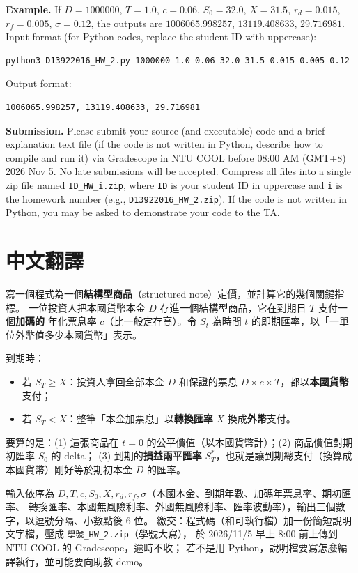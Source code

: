 \documentclass[11pt,a4paper]{article}
\begin{document}
\textbf{Example.} If $D=1000000$, $T=1.0$, $c=0.06$, $S_0=32.0$, $X=31.5$,
$r_d=0.015$, $r_f=0.005$, $\sigma=0.12$, the outputs are
$1006065.998257$, $13119.408633$, $29.716981$.
Input format (for Python codes, replace the student ID with uppercase):
\begin{verbatim}
python3 D13922016_HW_2.py 1000000 1.0 0.06 32.0 31.5 0.015 0.005 0.12
\end{verbatim}
Output format:
\begin{verbatim}
1006065.998257, 13119.408633, 29.716981
\end{verbatim}

\textbf{Submission.} Please submit your source (and executable) code and a brief
explanation text file (if the code is not written in Python, describe how to
compile and run it) via Gradescope in NTU COOL before 08:00 AM (GMT+8) 2026
Nov 5. No late submissions will be accepted. Compress all files into a single
zip file named \texttt{ID\_HW\_i.zip}, where \texttt{ID} is your student ID in
uppercase and \texttt{i} is the homework number (e.g.,
\texttt{D13922016\_HW\_2.zip}). If the code is not written in Python, you may
be asked to demonstrate your code to the TA.

\section{中文翻譯}

寫一個程式為一個\textbf{結構型商品}（structured note）定價，並計算它的幾個關鍵指標。
一位投資人把本國貨幣本金 $D$ 存進一個結構型商品，它在到期日 $T$ 支付一個\textbf{加碼的}
年化票息率 $c$（比一般定存高）。令 $S_t$ 為時間 $t$ 的即期匯率，以「一單位外幣值多少本國貨幣」表示。

到期時：
\begin{itemize}[nosep]
  \item 若 $S_T\ge X$：投資人拿回全部本金 $D$ 和保證的票息 $D\times c\times T$，都以\textbf{本國貨幣}支付；
  \item 若 $S_T<X$：整筆「本金加票息」以\textbf{轉換匯率} $X$ 換成\textbf{外幣}支付。
\end{itemize}

要算的是：(1) 這張商品在 $t=0$ 的公平價值（以本國貨幣計）；(2) 商品價值對期初匯率 $S_0$ 的 delta；
(3) 到期的\textbf{損益兩平匯率} $S_T^{*}$，也就是讓到期總支付（換算成本國貨幣）剛好等於期初本金 $D$ 的匯率。

輸入依序為 $D, T, c, S_0, X, r_d, r_f, \sigma$（本國本金、到期年數、加碼年票息率、期初匯率、
轉換匯率、本國無風險利率、外國無風險利率、匯率波動率），輸出三個數字，以逗號分隔、小數點後 6 位。
繳交：程式碼（和可執行檔）加一份簡短說明文字檔，壓成 \texttt{學號\_HW\_2.zip}（學號大寫），
於 2026/11/5 早上 8:00 前上傳到 NTU COOL 的 Gradescope，逾時不收；
若不是用 Python，說明檔要寫怎麼編譯執行，並可能要向助教 demo。
\end{document}
